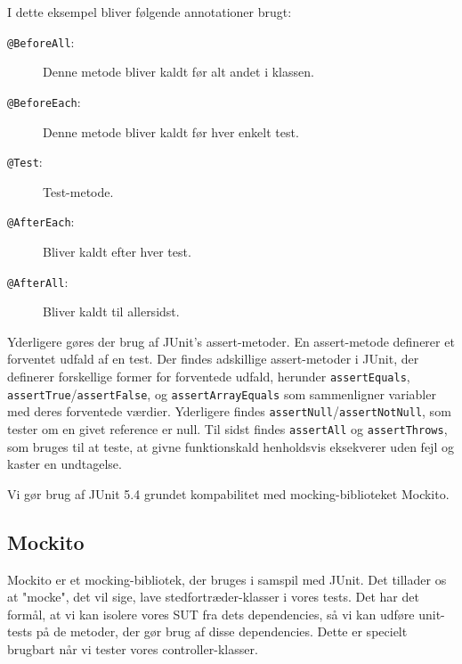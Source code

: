 I dette eksempel bliver følgende annotationer brugt\cite{JUnitDocumentation}: 
\begin{description}
    \item[\texttt{@BeforeAll}:] Denne metode bliver kaldt før alt andet i klassen.
    \item[\texttt{@BeforeEach}:] Denne metode bliver kaldt før hver enkelt test.
    \item[\texttt{@Test}:] Test-metode.
    \item[\texttt{@AfterEach}:] Bliver kaldt efter hver test.
    \item[\texttt{@AfterAll}:] Bliver kaldt til allersidst.      
\end{description}

Yderligere gøres der brug af JUnit's assert-metoder. En assert-metode definerer et forventet udfald af en test. Der findes adskillige assert-metoder i JUnit, der definerer forskellige former for forventede udfald, herunder \texttt{assertEquals}, \texttt{assertTrue}/\texttt{assertFalse}, og \texttt{assertArrayEquals} som sammenligner variabler med deres forventede værdier. Yderligere findes \texttt{assertNull}/\texttt{assertNotNull}, som tester om en givet reference er null. Til sidst findes \texttt{assertAll} og \texttt{assertThrows}, som bruges til at teste, at givne funktionskald henholdsvis eksekverer uden fejl og kaster en undtagelse\cite{JUnitDocumentation}.

Vi gør brug af JUnit 5.4 grundet kompabilitet med mocking-biblioteket Mockito.


\subsection{Mockito}
Mockito er et mocking-bibliotek, der bruges i samspil med JUnit. Det tillader os at "mocke", det vil sige, lave stedfortræder-klasser i vores tests. Det har det formål, at vi kan isolere vores SUT fra dets dependencies, så vi kan udføre unit-tests på de metoder, der gør brug af disse dependencies. Dette er specielt brugbart når vi tester vores controller-klasser.

